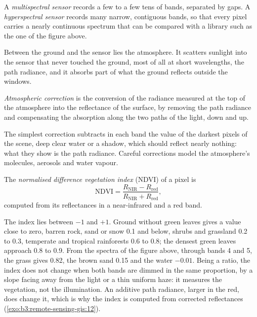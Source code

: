 \begin{definition}\label{def:b3:remote-sensing-gis:sensors}
A \emph{multispectral sensor} records a few
to a few tens of bands, separated by gaps. A \emph{hyperspectral
sensor} records many narrow, contiguous bands,
so that every pixel carries a nearly continuous spectrum that can be
compared with a library such as the one of the figure above.
\end{definition}

Between the ground and the sensor lies the atmosphere. It scatters
sunlight into the sensor that never touched the ground, most of all at
short wavelengths, the path radiance, and it absorbs part of what the
ground reflects outside the windows.

\begin{definition}\label{def:b3:remote-sensing-gis:atm-correction}
\emph{Atmospheric correction} is the
conversion of the radiance measured at the top of the atmosphere into the
reflectance of the surface, by removing the path radiance and compensating
the absorption along the two paths of the light, down and up.
\end{definition}

The simplest correction subtracts in each band the value of the darkest
pixels of the scene, deep clear water or a shadow, which should reflect
nearly nothing: what they show is the path radiance. Careful corrections
model the atmosphere's molecules, aerosols and water vapour.

\begin{definition}\label{def:b3:remote-sensing-gis:ndvi}
The \emph{normalised difference vegetation
index} (NDVI) of a pixel is
\[
\mathrm{NDVI} = \frac{R_\mathrm{NIR} - R_\mathrm{red}}{R_\mathrm{NIR} + R_\mathrm{red}} ,
\]
computed from its reflectances in a near-infrared and a red band.
\end{definition}

The index lies between $-1$ and $+1$. Ground without green leaves gives a
value close to zero, barren rock, sand or snow \num{0.1} and below,
shrubs and grassland 0.2 to 0.3, temperate and tropical rainforests 0.6 to
0.8; the densest green leaves approach 0.8 to 0.9. From the spectra of the
figure above, through bands 4 and 5, the grass gives 0.82, the brown sand
0.15 and the water $-0.01$. Being a ratio, the index does not change when
both bands are dimmed in the same proportion, by a slope facing away from
the light or a thin uniform haze: it measures the vegetation, not the
illumination. An additive path radiance, larger in the red, does change it,
which is why the index is computed from corrected reflectances
(\cref{exo:b3:remote-sensing-gis:12}).

